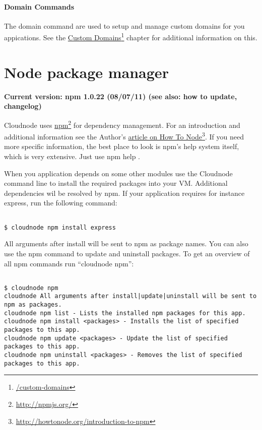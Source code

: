 \subsubsection{Domain Commands}
\label{domaincommands}

The domain command are used to setup and manage custom domains for you appications. See the \href{/custom-domains}{Custom Domains}\footnote{\href{/custom-domains}{\slash custom-domains}} chapter for additional information on this.

\chapter{Node package manager}
\label{nodepackagemanager}

\textbf{Current version: npm 1.0.22 (08\slash 07\slash 11) (see also: how to update, changelog)}

Cloudnode uses \href{http://npmjs.org/}{npm}\footnote{\href{http://npmjs.org/}{http:/\slash npmjs.org\slash }} for dependency management. For an introduction and additional information see the Author's \href{http://howtonode.org/introduction-to-npm}{article on How To Node}\footnote{\href{http://howtonode.org/introduction-to-npm}{http:/\slash howtonode.org\slash introduction-to-npm}}. If you need more specific information, the best place to look is npm’s help system itself, which is very extensive. Just use npm help .

When you application depends on some other modules use the Cloudnode command line to install the required packages into your VM. Additional dependencies wil be resolved by npm. If your application requires for instance express, run the following command:

\begin{adjustwidth}{2.5em}{2.5em}
\begin{verbatim}

$ cloudnode npm install express

\end{verbatim}
\end{adjustwidth}

All arguments after install will be sent to npm as package names. You can also use the npm command to update and uninstall packages. To get an overview of all npm commands run ``cloudnode npm'':

\begin{adjustwidth}{2.5em}{2.5em}
\begin{verbatim}

$ cloudnode npm
cloudnode All arguments after install|update|uninstall will be sent to npm as packages.
cloudnode npm list - Lists the installed npm packages for this app.
cloudnode npm install <packages> - Installs the list of specified packages to this app.
cloudnode npm update <packages> - Update the list of specified packages to this app.
cloudnode npm uninstall <packages> - Removes the list of specified packages to this app.

\end{verbatim}
\end{adjustwidth}

